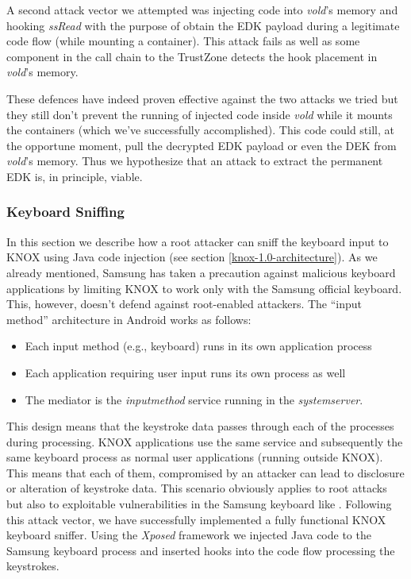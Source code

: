 \documentclass[11pt]{article}
\begin{document}
A second attack vector we attempted was injecting code into \emph{vold}'s memory and hooking \emph{ssRead} with the purpose of obtain the EDK 
payload during a legitimate code flow (while mounting a container). 
This attack fails as well as some component in the call chain to the TrustZone detects the hook placement in \emph{vold}'s memory.

These defences have indeed proven effective against the two attacks we tried but they still don't prevent the running of injected code inside \emph{vold} 
while it mounts the containers (which we've successfully accomplished). 
This code could still, at the opportune moment, pull the decrypted EDK payload or even the DEK from \emph{vold}'s memory.
Thus we hypothesize that an attack to extract the permanent EDK is, in principle, viable.

\subsubsection{Keyboard Sniffing} \label{knox-1.0-keyboard-sniffing}
In this section we describe how a root attacker can sniff the keyboard input to KNOX using Java code injection (see section \ref{knox-1.0-architecture}).
As we already mentioned, Samsung has taken a precaution against malicious keyboard applications by limiting KNOX to work only with the Samsung 
official keyboard. This, however, doesn't defend against root-enabled attackers.
The ``input method'' architecture in Android works as follows:
\begin{itemize}[itemsep=-2pt,topsep=0pt,leftmargin=1em]
\item Each input method (e.g., keyboard) runs in its own application process
\item Each application requiring user input runs its own process as well
\item The mediator is the \emph{input\textunderscore method} service running in the \emph{system\textunderscore server}.
\end{itemize}
This design means that the keystroke data passes through each of the processes during processing. KNOX applications use the same service and 
subsequently the same keyboard process as normal user applications (running outside KNOX). This means that each of them, compromised by an attacker
can lead to disclosure or alteration of keystroke data. This scenario obviously applies to root attacks but also to exploitable vulnerabilities in the 
Samsung keyboard like \cite{CVE-2015-4640}. Following this attack vector, we have successfully implemented a fully functional KNOX keyboard sniffer. 
Using the \emph{Xposed} framework we injected Java code to the Samsung keyboard process and inserted hooks into the code flow processing the keystrokes. 
\end{document}
